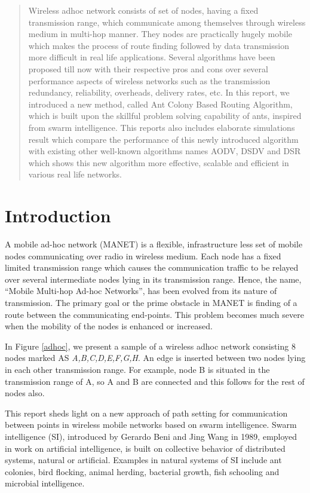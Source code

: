 \newpage
\begin{abstract}
Wireless adhoc network consists of set of nodes, having a fixed transmission range, which communicate among themselves through wireless medium in multi-hop manner. They nodes are practically hugely mobile which makes the process of route finding followed by data transmission more difficult in real life applications. Several algorithms have been proposed till now with their respective pros and cons over several performance aspects of wireless networks such as the transmission redundancy, reliability, overheads, delivery rates, etc. In this report, we introduced a new method, called Ant Colony Based Routing Algorithm, which is built upon the skillful problem solving capability of ants, inspired from swarm intelligence. This reports also includes elaborate simulations result which compare the performance of this newly introduced algorithm with existing other well-known algorithms names AODV, DSDV and DSR which shows this new algorithm more effective, scalable and efficient in various real life networks.
\end{abstract}

\section{Introduction}
A mobile ad-hoc network (MANET) is a flexible, infrastructure less set of mobile nodes communicating over radio in wireless medium. Each node has a fixed limited transmission range which causes the communication traffic to be relayed over several intermediate nodes lying in its transmission range. Hence, the name, “Mobile Multi-hop Ad-hoc Networks”, has been evolved from its nature of transmission. The primary goal or the prime obstacle in MANET is finding of a route between the communicating end-points. This problem becomes much severe when the mobility of the nodes is enhanced or increased.

In Figure \ref{adhoc}, we present a sample of a wireless adhoc network consisting 8 nodes marked AS \textit{A,B,C,D,E,F,G,H}. An edge is inserted between two nodes lying in each other transmission range. For example, node B is situated in the transmission range of A, so A and B are connected and this follows for the rest of nodes also.



This report sheds light on a new approach of path setting for communication between points in wireless mobile networks based on swarm intelligence. Swarm intelligence (SI), introduced by Gerardo Beni and Jing Wang in 1989, employed in work on artificial intelligence, is built on collective behavior of distributed systems, natural or artificial.  Examples in natural systems of SI include ant colonies, bird flocking, animal herding, bacterial growth, fish schooling and microbial intelligence. 


